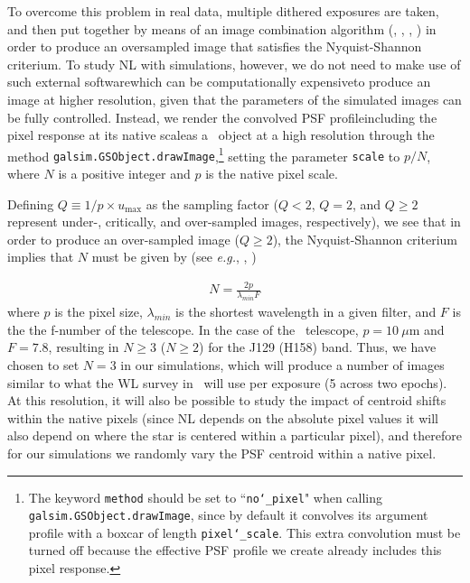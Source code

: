 \documentclass[11pt,preprint,flushrt]{aastex}
\begin{document}
To overcome this problem in real data, multiple dithered exposures are taken, and then put together by means of an image combination algorithm (\citealt{lauer99b}, \citealt{fruchter02}, \citealt{bertin06}, \citealt{rowe11}) in order to produce an oversampled image that satisfies the Nyquist-Shannon criterium. To study NL with simulations, however, we do not need to make use of such external software\textemdash which can be computationally expensive\textemdash to produce an image at higher resolution, given that the parameters of the simulated images can be fully controlled.  Instead, we render the convolved PSF profile\textemdash including the pixel response at its native scale\textemdash as a \gs\ object at a high resolution through the method {\tt{galsim.GSObject.drawImage}},\footnote{The keyword {\tt{method}} should be set to ``{\tt{no\char`_pixel}}" when calling {\tt{galsim.GSObject.drawImage}}, since by default it convolves its argument profile with a boxcar of length {\tt{pixel\char`_scale}}. This extra convolution must be turned off because the effective PSF profile we create already includes this pixel response.} setting the parameter {\tt{scale}} to $p/N$, where $N$ is a positive integer and $p$ is the native pixel scale. 
 
Defining $Q\equiv1/p\times u_{\text{max}}$ as the sampling factor ($Q<2$, $Q=2$, and $Q\geq2$ represent under-, critically, and over-sampled images, respectively), we see that in order to produce an over-sampled image ($Q\geq2$), the Nyquist-Shannon criterium implies that $N$ must be given by (see \emph{e.g.}, \citealt{marks09}, \citealt{shapiro13})

\begin{align}
N=\frac{2p}{\lambda_{min} F}
\label{nimages}
\end{align}
where $p$ is the pixel size, $\lambda_{min}$ is the shortest wavelength in a given filter, and $F$ is the the f-number of the telescope. In the case of the \wfa\ telescope, $p=10\ \mu$m and $F=7.8$, resulting in $N\geq3$ ($N\geq2$) for the J129 (H158) band. Thus, we have chosen to set $N=3$ in our simulations, which will produce a number of images similar to what the WL survey in \wf\ will use per exposure (5 across two epochs). At this resolution, it will also be possible to study the impact of centroid shifts within the native pixels (since NL depends on the absolute pixel values it will also depend on where the star is centered within a particular pixel), and therefore for our simulations we randomly vary the PSF centroid within a native pixel.
\end{document}
